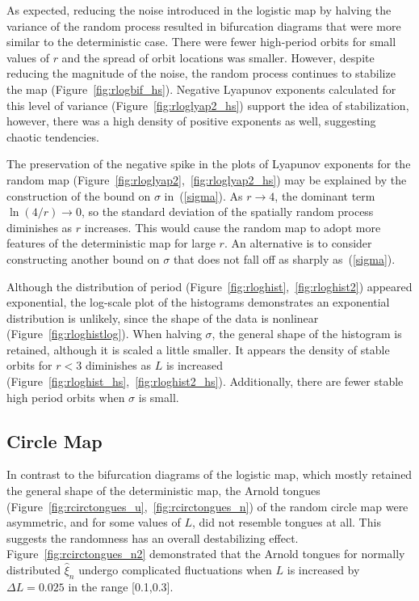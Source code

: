 As expected, reducing the noise introduced in the logistic
map by halving the variance of the random process resulted in
bifurcation diagrams that were more similar to the deterministic
case. There were fewer high-period orbits for small values of $r$ and the spread of orbit
locations was smaller. However, despite reducing
the magnitude of the noise, the random process continues to stabilize
the map (Figure~\ref{fig:rlogbif_hs}). Negative Lyapunov exponents calculated
for this level of variance (Figure~\ref{fig:rloglyap2_hs}) support the
idea of stabilization, however, there was a high density of positive
exponents as well, suggesting chaotic tendencies.

The preservation of the negative spike in the plots of Lyapunov
exponents for the random map
(Figure~\ref{fig:rloglyap2},~\ref{fig:rloglyap2_hs}) may be explained
by the construction of the bound on $\sigma$ in~(\ref{sigma}). As $r \to 4$, the
dominant term $\ln(4/r)
\to 0$, so the standard deviation of the spatially random process diminishes as
$r$ increases. This would cause the random map to adopt more features
of the deterministic map for large $r$. An alternative is to consider constructing
another bound on $\sigma$ that does not fall off as sharply as~(\ref{sigma}).

Although the distribution of period (Figure~\ref{fig:rloghist},~\ref{fig:rloghist2})
appeared exponential, the log-scale plot of the histograms
demonstrates an exponential distribution is unlikely, since the shape
of the data is nonlinear (Figure~\ref{fig:rloghistlog}). When halving
$\sigma$, the general shape of the histogram is retained, although it is scaled a
little smaller. It appears the density of
stable orbits for $r<3$ diminishes as $L$ is increased (Figure~\ref{fig:rloghist_hs},~\ref{fig:rloghist2_hs}). Additionally,
there are fewer stable high period orbits when $\sigma$ is small. 
\subsection{Circle Map}
In contrast to the bifurcation diagrams of the logistic map, which
mostly retained the general shape of the deterministic map, the
Arnold tongues (Figure~\ref{fig:rcirctongues_u},~\ref{fig:rcirctongues_n}) of the
random circle map were asymmetric, and for some values of $L$, did not
resemble tongues at all. This suggests the randomness has an overall
destabilizing effect. Figure~\ref{fig:rcirctongues_n2} demonstrated
that the Arnold tongues for normally distributed $\hat{\xi}_n$ undergo
complicated fluctuations when $L$ is increased by $\Delta L=0.025$ in the range [0.1,0.3].

